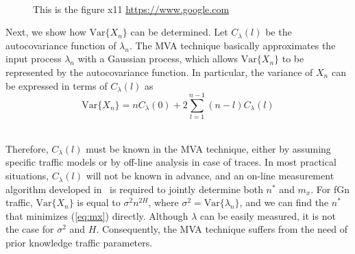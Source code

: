 \documentclass[12pt,oneside,openright,a4paper]{cpe-english-project}
\begin{document}
 \\


 \begin{figure}[!h]
\caption{This is the figure x11 \href{https://www.google.com} {https://www.google.com}}\label{fig:x1}
\end{figure}

Next, we show how $\mathrm{Var}\{X_n\}$ can be determined.  Let
$C_{\lambda}(l)$ be the autocovariance function of $\lambda_n$.  The
MVA technique basically approximates the input process $\lambda_n$
with a Gaussian process, which allows $\mathrm{Var}\{X_n\}$ to be
represented by the autocovariance function.  In particular, the
variance of $X_n$ can be expressed in terms of $C_{\lambda}(l)$ as
\begin{equation}
  \mathrm{Var}\{X_n\} = nC_{\lambda}(0) + 2\sum_{l=1}^{n-1} (n-l)C_{\lambda}(l)
\end{equation} 

 \\

Therefore, $C_{\lambda}(l)$ must be known in the MVA technique, either
by assuming specific traffic models or by off-line analysis in case of
traces.  In most practical situations, $C_{\lambda}(l)$ will not be
known in advance, and an on-line measurement algorithm developed
in~\cite{eun01} is required to jointly determine both $n^\ast$ and
$m_x$. For fGn traffic, $\mathrm{Var}\{X_n\}$ is equal to $\sigma^2
n^{2H}$, where $\sigma^2 = \mathrm{Var}\{\lambda_n\}$, and we can find
the $n^\ast$ that minimizes (\ref{eq:mx}) directly. Although $\lambda$
can be easily measured, it is not the case for $\sigma^2$ and $H$.
Consequently, the MVA technique suffers from the need of prior
knowledge traffic parameters. 
\end{document}
